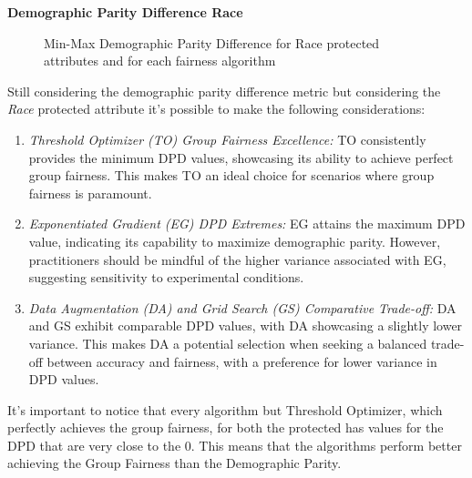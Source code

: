 \newpage
\textbf{Demographic Parity Difference Race}
\begin{figure}[H]
    \centering
    \caption{Min-Max Demographic Parity Difference for Race protected attributes and for each fairness algorithm}
\end{figure}

Still considering the demographic parity difference metric but considering the \emph{Race} protected attribute it's possible to make the following considerations:

\begin{enumerate}
    \item \emph{Threshold Optimizer (TO) Group Fairness Excellence:} TO consistently provides the minimum DPD values, showcasing its ability to achieve perfect group fairness. This makes TO an ideal choice for scenarios where group fairness is paramount.

    \item \emph{Exponentiated Gradient (EG) DPD Extremes:} EG attains the maximum DPD value, indicating its capability to maximize demographic parity. However, practitioners should be mindful of the higher variance associated with EG, suggesting sensitivity to experimental conditions.

    \item \emph{Data Augmentation (DA) and Grid Search (GS) Comparative Trade-off:} DA and GS exhibit comparable DPD values, with DA showcasing a slightly lower variance. This makes DA a potential selection when seeking a balanced trade-off between accuracy and fairness, with a preference for lower variance in DPD values.
\end{enumerate}


It's important to notice that every algorithm but Threshold Optimizer, which perfectly achieves the group fairness, for both the protected has values for the DPD that are very close to the 0. This means that the algorithms perform better achieving the Group Fairness than the Demographic Parity.